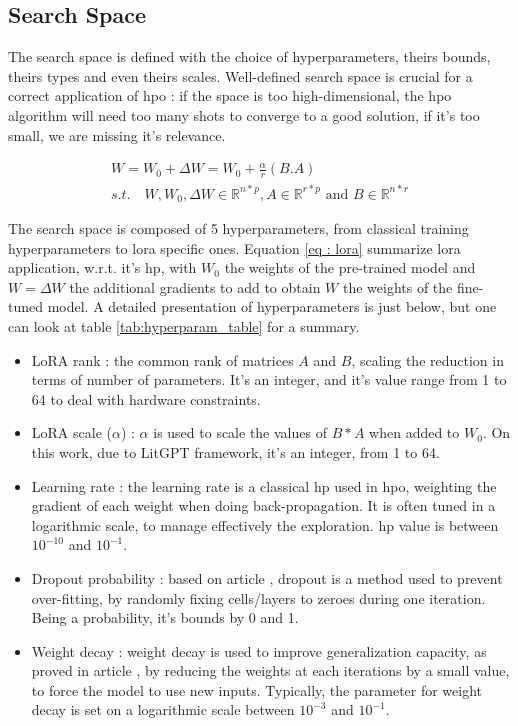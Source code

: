 \subsection{Search Space}
\label{sec:search_space}

The search space is defined with the choice of hyperparameters, theirs bounds, theirs types and even theirs scales.  Well-defined search space is crucial for a correct application of \acrshort{hpo} : if the space is too high-dimensional, the \acrshort{hpo} algorithm will need too many shots to converge to a good solution, if it's too small, we are missing it's relevance. 

\begin{equation}
    \begin{split}
    W = W_0 + \Delta W = W_0 + \frac{\alpha}{r}(B.A) \\
    s.t. \quad W,W_0,\Delta W \in \mathbb{R}^{n*p},
    A \in \mathbb{R}^{r*p} \text{ and } B \in \mathbb{R}^{n*r}
    \end{split}
    \label{eq : lora}
\end{equation}

The search space is composed of 5 hyperparameters, from classical training hyperparameters to \acrshort{lora} specific ones. Equation \ref{eq : lora} summarize \acrshort{lora} application, w.r.t. it's \gls{hp}, with $W_0$ the weights of the pre-trained model and $W=\Delta W$ the additional gradients to add to obtain $W$ the weights of the fine-tuned model. A detailed presentation of hyperparameters is just below, but one can look at table \ref{tab:hyperparam_table} for a summary.
\begin{itemize}
    \item LoRA rank : the common rank of matrices $A$ and $B$, scaling the reduction in terms of number of parameters. It's an integer, and it's value range from 1 to 64 to deal with hardware constraints.
    \item LoRA scale ($\alpha$) : $\alpha$ is used to scale the values of $B*A$ when added to $W_0$. On this work, due to LitGPT framework, it's an integer, from 1 to 64.
    \item Learning rate : the learning rate is a classical \gls{hp} used in \acrshort{hpo}, weighting the gradient of each weight when doing back-propagation. It is often tuned in a logarithmic scale, to manage effectively the exploration. \Gls{hp} value is between $10^{-10}$ and $10^{-1}$.
    \item Dropout probability : based on article \cite{srivastava_dropout_2014}, dropout is a method used to prevent over-fitting, by randomly fixing cells/layers to zeroes during one iteration. Being a probability, it's bounds by 0 and 1.
    \item Weight decay : weight decay is used to improve generalization capacity, as proved in article \cite{krogh_simple_1991}, by reducing the weights at each iterations by a small value, to force the model to use new inputs. Typically, the parameter for weight decay is set on a logarithmic scale between $10^{-3}$ and $10^{-1}$.
\end{itemize}

